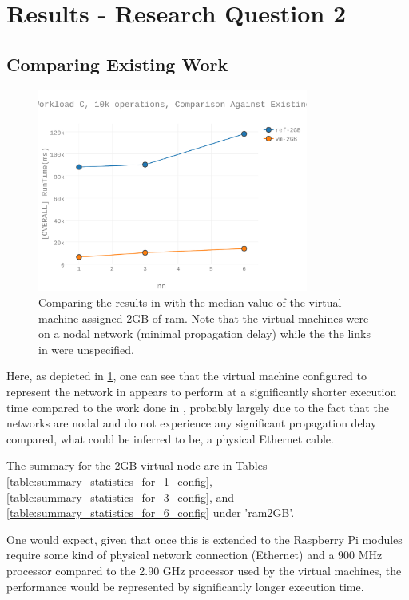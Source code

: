 \section{Results - Research Question 2}

\subsection{Comparing Existing Work}

\begin{figure}[h]
\includegraphics[width=3.5in]{Figures/figures-wlc_fig5.pdf}

\caption{Comparing the results in \cite{Abramova2014} with the median value of the virtual machine assigned 2GB of \gls{ram}.  Note that the virtual machines were on a nodal network (minimal propagation delay) while the the links in \cite{Abramova2014} were unspecified.}

\label{fig:figures-wlc_fig5}
\end{figure}

Here, as depicted in \ref{fig:figures-wlc_fig5}, one can see that the virtual machine configured to represent the network in \cite{Abramova2014} appears to perform at a significantly shorter execution time compared to the work done in \cite{Abramova2014}, probably largely due to the fact that the networks are nodal and do not experience any significant propagation delay compared, what could be inferred to be, a physical Ethernet cable.

The summary for the 2GB virtual node are in Tables \ref{table:summary_statistics_for_1_config}, \ref{table:summary_statistics_for_3_config}, and \ref{table:summary_statistics_for_6_config} under 'ram2GB'.  

One would expect, given that once this is extended to the Raspberry Pi modules require some kind of physical network connection (Ethernet) and a 900 MHz processor compared to the 2.90 GHz processor used by the virtual machines, the performance would be represented by significantly longer execution time.  

